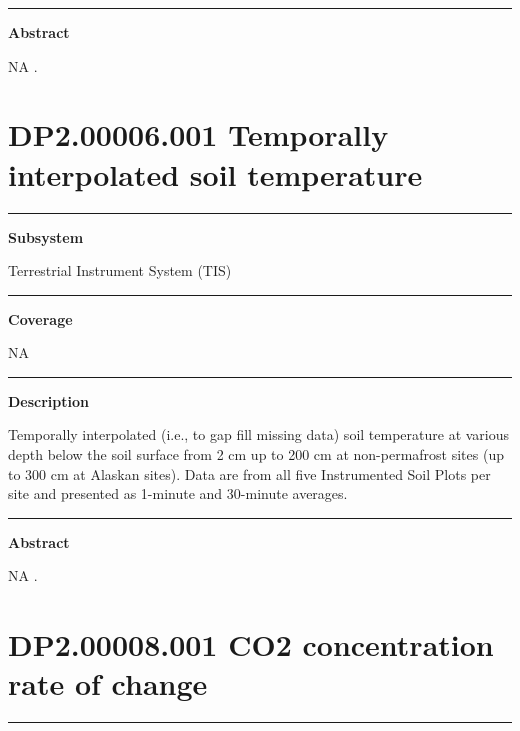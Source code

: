 \documentclass[]{article}
\begin{document}
\begin{center}\rule{0.5\linewidth}{\linethickness}\end{center}

\textbf{Abstract}

NA \newpage
.

\section{DP2.00006.001 Temporally interpolated soil
temperature}\label{dp2.00006.001-temporally-interpolated-soil-temperature}

\begin{center}\rule{0.5\linewidth}{\linethickness}\end{center}

\textbf{Subsystem}

Terrestrial Instrument System (TIS)

\begin{center}\rule{0.5\linewidth}{\linethickness}\end{center}

\textbf{Coverage}

NA

\begin{center}\rule{0.5\linewidth}{\linethickness}\end{center}

\textbf{Description}

Temporally interpolated (i.e., to gap fill missing data) soil
temperature at various depth below the soil surface from 2 cm up to 200
cm at non-permafrost sites (up to 300 cm at Alaskan sites). Data are
from all five Instrumented Soil Plots per site and presented as 1-minute
and 30-minute averages.

\begin{center}\rule{0.5\linewidth}{\linethickness}\end{center}

\textbf{Abstract}

NA \newpage
.

\section{DP2.00008.001 CO2 concentration rate of
change}\label{dp2.00008.001-co2-concentration-rate-of-change}

\begin{center}\rule{0.5\linewidth}{\linethickness}\end{center}
\end{document}
